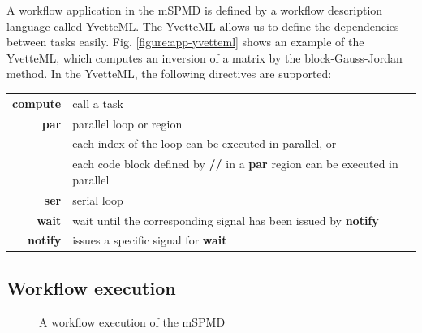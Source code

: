 \documentclass[graybox]{svmult}
\begin{document}
A workflow application in the mSPMD is defined by a workflow description language called YvetteML. 
The YvetteML allows us to define the dependencies between tasks easily. 
Fig. \ref{figure:app-yvetteml} shows an example of the YvetteML, which computes an inversion of a matrix  by the block-Gauss-Jordan method. 
In the YvetteML, the following directives are supported:\\
\begin{tabular}[t]{rl}
 {\bf compute}& call a task \\
 {\bf par} & parallel loop or region\\
           & each index of the loop can be executed in parallel, or\\ 
           & each code block defined by {\bf // }in a {\bf par} region can be executed in parallel\\
 {\bf ser} & serial loop\\
 {\bf wait} & wait until the corresponding signal has been issued by {\bf notify}\\
 {\bf notify} & issues a specific signal for {\bf wait}
\end{tabular}

\subsection{Workflow execution}

\begin{figure}[t]
 \begin{center}
  \caption{A workflow execution of the mSPMD}
  \label{figure:app-execution}
 \end{center}
\end{figure}
\end{document}
